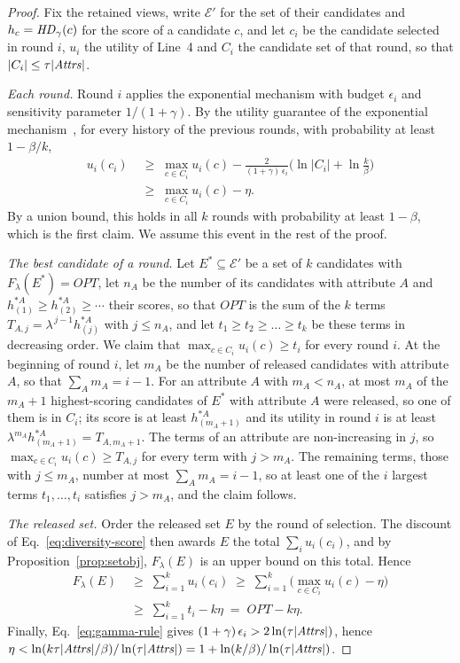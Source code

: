 \begin{proof}
Fix the retained views, write $\mathcal{E}'$ for the set of their candidates and $h_c=\mathit{HD}_\gamma(c)$ for the score of a candidate $c$, and let $c_i$ be the candidate selected in round $i$, $u_i$ the utility of Line~4 and $C_i$ the candidate set of that round, so that $|C_i|\le\tau|\mathit{Attrs}|$.

\emph{Each round.}
Round $i$ applies the exponential mechanism with budget $\epsilon_i$ and sensitivity parameter $1/(1+\gamma)$.
By the utility guarantee of the exponential mechanism~\cite{mcsherry2007,TheAlgFoundDP2014}, for every history of the previous rounds, with probability at least $1-\beta/k$,
\begin{align*}
u_i(c_i)&\;\ge\;\max_{c\in C_i}u_i(c)-\frac{2}{(1+\gamma)\,\epsilon_i}\Big(\ln|C_i|+\ln\frac{k}{\beta}\Big)\\
&\;\ge\;\max_{c\in C_i}u_i(c)-\eta .
\end{align*}
By a union bound, this holds in all $k$ rounds with probability at least $1-\beta$, which is the first claim.
We assume this event in the rest of the proof.

\emph{The best candidate of a round.}
Let $E^*\subseteq\mathcal{E}'$ be a set of $k$ candidates with $F_\lambda(E^*)=\mathit{OPT}$, let $n_A$ be the number of its candidates with attribute $A$ and $h^{*A}_{(1)}\ge h^{*A}_{(2)}\ge\cdots$ their scores, so that $\mathit{OPT}$ is the sum of the $k$ terms $T_{A,j}=\lambda^{\,j-1}h^{*A}_{(j)}$ with $j\le n_A$, and let $t_1\ge t_2\ge\dots\ge t_k$ be these terms in decreasing order.
We claim that $\max_{c\in C_i}u_i(c)\ge t_i$ for every round $i$.
At the beginning of round $i$, let $m_A$ be the number of released candidates with attribute $A$, so that $\sum_A m_A=i-1$.
For an attribute $A$ with $m_A<n_A$, at most $m_A$ of the $m_A+1$ highest-scoring candidates of $E^*$ with attribute $A$ were released, so one of them is in $C_i$; its score is at least $h^{*A}_{(m_A+1)}$ and its utility in round $i$ is at least $\lambda^{m_A}h^{*A}_{(m_A+1)}=T_{A,m_A+1}$.
The terms of an attribute are non-increasing in $j$, so $\max_{c\in C_i}u_i(c)\ge T_{A,j}$ for every term with $j>m_A$.
The remaining terms, those with $j\le m_A$, number at most $\sum_A m_A=i-1$, so at least one of the $i$ largest terms $t_1,\dots,t_i$ satisfies $j>m_A$, and the claim follows.

\emph{The released set.}
Order the released set $E$ by the round of selection.
The discount of Eq.~\eqref{eq:diversity-score} then awards $E$ the total $\sum_i u_i(c_i)$, and by Proposition~\ref{prop:setobj}, $F_\lambda(E)$ is an upper bound on this total.
Hence
\begin{align*}
F_\lambda(E)&\;\ge\;\sum_{i=1}^{k}u_i(c_i)\;\ge\;\sum_{i=1}^{k}\Big(\max_{c\in C_i}u_i(c)-\eta\Big)\\
&\;\ge\;\sum_{i=1}^{k}t_i-k\eta\;=\;\mathit{OPT}-k\eta .
\end{align*}
Finally, Eq.~\eqref{eq:gamma-rule} gives $(1+\gamma)\,\epsilon_i>2\ln(\tau|\mathit{Attrs}|)$, hence $\eta<\ln(k\tau|\mathit{Attrs}|/\beta)/\ln(\tau|\mathit{Attrs}|)=1+\ln(k/\beta)/\ln(\tau|\mathit{Attrs}|)$.
\end{proof}

